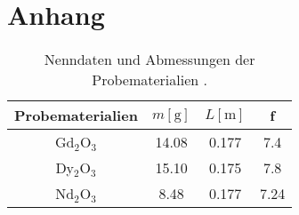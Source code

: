 \section{Anhang}


\begin{table}
    \caption{Nenndaten und Abmessungen der Probematerialien \cite{skript}.}
    \centering
    \label{tab:messspule}
    \begin{tabular}{c || c c c}
        \toprule
        \tiny Probematerialien & $m [\si{\gram}]$ & $L [\si{\meter}]$ & f\\
        \midrule
        Gd$_2$O$_3$ & 14.08 & 0.177 & 7.4 \\
        \midrule
        Dy$_2$O$_3$ & 15.10 & 0.175 & 7.8 \\
        \midrule
        Nd$_2$O$_3$ & 8.48  & 0.177 & 7.24 \\
        \bottomrule    
    \end{tabular}
\end{table}

